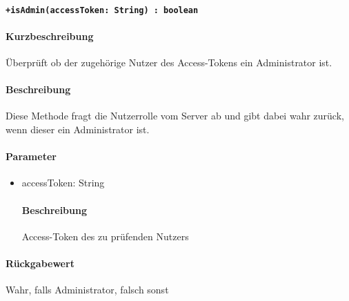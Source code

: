 \paragraph{\texttt{+isAdmin(accessToken: String) : boolean}}%
\paragraph*{Kurzbeschreibung}
Überprüft ob der zugehörige Nutzer des Access-Tokens ein Administrator ist.
\paragraph*{Beschreibung}
Diese Methode fragt die Nutzerrolle vom Server ab und gibt dabei wahr zurück, wenn dieser ein Administrator ist.
\paragraph*{Parameter}
\begin{itemize}
    \item accessToken: String
            \paragraph*{Beschreibung}
            Access-Token des zu prüfenden Nutzers
\end{itemize}
\paragraph*{Rückgabewert}
Wahr, falls Administrator, falsch sonst